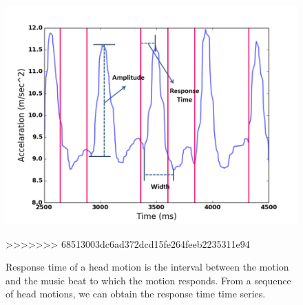 
\begin{figure}[t]
\includegraphics[width=.75\columnwidth]{figure/waveform_resp.png}
\centering
\caption{\label{fig:waveform}Response time of a head motion is the interval between the motion and the music beat to which the motion responds. From a sequence of head motions, we can obtain the response time time series.}
>>>>>>> 68513003dc6ad372dcd15fe264feeb2235311e94
\end{figure}


